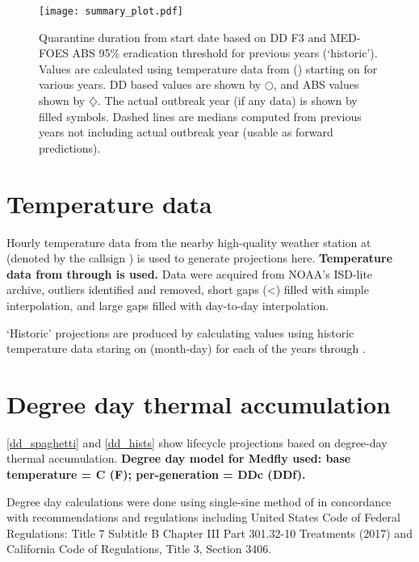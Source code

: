 \documentclass[10pt]{article}
\begin{document}
\begin{figure}[H]
\centering
\texttt{[image: summary\_plot.pdf]}
\caption{
\label{summary_plot}
Quarantine duration from start date based on DD F3 and MED-FOES ABS 95\% eradication threshold for previous years (`historic').
Values are calculated using temperature data from \VarStationDescription (\VarStation) starting on \VarStartDOY 
for various years.  DD based values are shown by $\bigcirc$, and ABS values shown by $\diamondsuit$.  
The actual outbreak year (if any data) is shown by filled symbols.
Dashed lines are medians computed from previous years not including actual outbreak year (usable as forward predictions).
}
\end{figure}

\section*{Temperature data}

Hourly temperature data from the nearby high-quality weather station at 
\VarStationDescription (denoted by the callsign \VarStation) is used to generate
projections here.
\textbf{Temperature data from \VarTempStartDate through \VarEndDateOfTempData is used.}
Data were acquired from NOAA's ISD-lite archive,
outliers identified and removed, 
short gaps (\textless \VarLargeGapSize [HH:MM:SS]) filled with simple interpolation, 
and large gaps filled with day-to-day interpolation.\cite{10.12688/f1000research.12817.1}

`Historic' projections are produced by calculating values using historic temperature data 
staring on \VarStartDOY (month-day) for each of the years \VarTempStartYear through \VarTempEndYear.


\section*{Degree day thermal accumulation}

\autoref{dd_spaghetti} and \autoref{dd_hists} show lifecycle projections based on 
degree-day thermal accumulation.
\textbf{Degree day model for Medfly used:
base temperature = \VarDDBaseTempC \degree C (\VarDDBaseTempF \degree F);
per-generation = \VarGenDDc DDc (\VarGenDDf DDf).}

Degree day calculations were done using single-sine method of \citet{ECY:ECY1969503514}
in concordance with recommendations and regulations including 
United States Code of Federal Regulations: Title 7 Subtitle B Chapter III Part 301.32-10 Treatments (2017)\cite{US-301.32-10}
and California Code of Regulations, Title 3, Section 3406\cite{3-CA-ADC-3406}.
\end{document}
